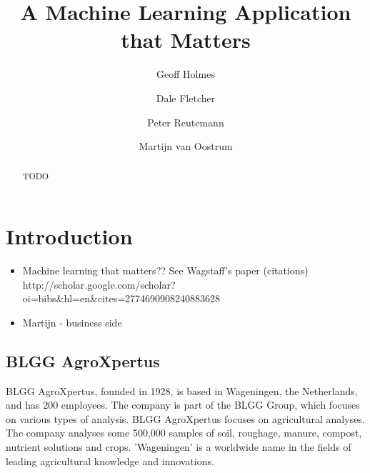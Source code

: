 \documentclass{llncs}
\begin{document}
%
%
\mainmatter              %
%
\title{A Machine Learning Application that Matters}
%
%
\author{Geoff Holmes \and Dale Fletcher \and Peter Reutemann \and Martijn van Oostrum}
%
%
%

\maketitle              %

\begin{abstract}
TODO
\end{abstract}

\section{Introduction}
\begin{itemize}
  \item Machine learning that matters?? See Wagstaff’s paper (citations) \\
    http://scholar.google.com/scholar?oi=bibs\&hl=en\&cites=2774690908240883628
  \item Martijn - business side
\end{itemize}

\subsection{BLGG AgroXpertus}

BLGG AgroXpertus, founded in 1928, is based in Wageningen, the Netherlands, and has 200 employees. The company is part of the BLGG Group, which focuses on various types of analysis. BLGG AgroXpertus focuses on agricultural analyses. The company analyses some 500,000 samples of soil, roughage, manure, compost, nutrient solutions and crops. 
'Wageningen' is a worldwide name in the fields of leading agricultural knowledge and innovations. 
\end{document}
